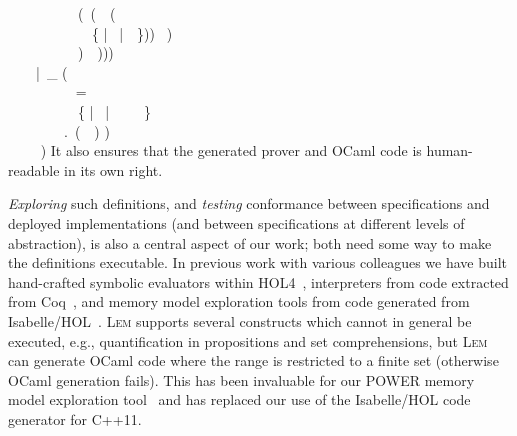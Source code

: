 \documentclass[a4paper]{llncs}
\newcommand{\myparagraph}[1]{\vspace{0.5\baselineskip}\par\noindent{\normalsize\bfseries{#1}}\quad}
\newcommand{\Lem}{\textsc{Lem}}
\begin{document}
{{\ \ \ \ \ \ \ \ \ \ (\  (\  \  (\  \  \\{}
\ \ \ \ \ \ \ \ \ \ \ \ \{ | \forall {} \mathord{\in}   \ |\  \  \}))\   )\\{}
\ \ \ \ \ \ \ \ \ \ )\  \  )))\\{}
\ \ \ \ |\  \_   \rightarrow ( \\{}
\ \ \ \ \ \ \ \ \   = \\{}
\ \ \ \ \ \ \ \ \ \ \{ | \forall {} \mathord{\in}   \ |\  \  \  \lemTermConst{=}\  \  \} \ \\{}
\ \ \ \ \ \ \ \ .\  (\  \  ) ) \\{}
\ \ \ \  )
}
}
\noindent It also ensures that the generated prover and OCaml code is
human-readable in its own right.

%

\myparagraph{3. Support for execution}
\emph{Exploring} such definitions, and \emph{testing} conformance between
specifications and deployed implementations (and between specifications at
different levels of abstraction), is also a central aspect of our work; both
need some way to make the definitions executable.  In previous work with various
colleagues we have built hand-crafted symbolic evaluators within
HOL4~\cite{BDJRS06,TCP:paper,RNS08,x86popl,TCP:techpaper},
interpreters from code extracted from Coq~\cite{Ctso}, and memory model
exploration tools from code generated from Isabelle/HOL~\cite{C++}.
%
\Lem{} supports several constructs which cannot in general be executed, e.g.,
quantification in propositions and set comprehensions,
but \Lem{} can generate OCaml code where
the range is restricted to a finite set (otherwise OCaml generation
fails).  This has been invaluable for our POWER memory
model exploration tool~\cite{pldi11} and has replaced our use of the Isabelle/HOL code
generator for C++11.
\end{document}
